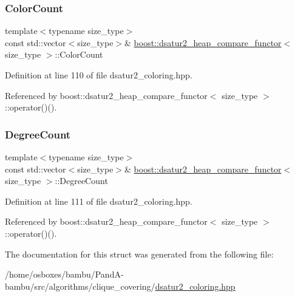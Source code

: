 \subsubsection{\texorpdfstring{Color\+Count}{ColorCount}}
{\footnotesize\ttfamily template$<$typename size\+\_\+type$>$ \\
const std\+::vector$<$size\+\_\+type$>$\& \hyperlink{structboost_1_1dsatur2__heap__compare__functor}{boost\+::dsatur2\+\_\+heap\+\_\+compare\+\_\+functor}$<$ size\+\_\+type $>$\+::Color\+Count\hspace{0.3cm}{\ttfamily [private]}}



Definition at line 110 of file dsatur2\+\_\+coloring.\+hpp.



Referenced by boost\+::dsatur2\+\_\+heap\+\_\+compare\+\_\+functor$<$ size\+\_\+type $>$\+::operator()().

\mbox{\label{structboost_1_1dsatur2__heap__compare__functor_a647602dc2dfe4b88698bdd678ce34882}} 
\subsubsection{\texorpdfstring{Degree\+Count}{DegreeCount}}
{\footnotesize\ttfamily template$<$typename size\+\_\+type$>$ \\
const std\+::vector$<$size\+\_\+type$>$\& \hyperlink{structboost_1_1dsatur2__heap__compare__functor}{boost\+::dsatur2\+\_\+heap\+\_\+compare\+\_\+functor}$<$ size\+\_\+type $>$\+::Degree\+Count\hspace{0.3cm}{\ttfamily [private]}}



Definition at line 111 of file dsatur2\+\_\+coloring.\+hpp.



Referenced by boost\+::dsatur2\+\_\+heap\+\_\+compare\+\_\+functor$<$ size\+\_\+type $>$\+::operator()().



The documentation for this struct was generated from the following file\+:\begin{DoxyCompactItemize}
\item 
/home/osboxes/bambu/\+Pand\+A-\/bambu/src/algorithms/clique\+\_\+covering/\hyperlink{dsatur2__coloring_8hpp}{dsatur2\+\_\+coloring.\+hpp}\end{DoxyCompactItemize}
